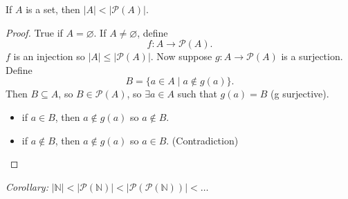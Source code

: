 \documentclass[11pt]{article}
\let\emptyset\varnothing
\begin{document}
   If $A$ is a set, then \(|A| < |\mathcal{P}(A)|.\)

   \begin{proof}
       True if \(A = \emptyset\). If \(A \neq \emptyset\), define \[f:A \rightarrow \mathcal{P}(A).\] $f$ is an injection so \(|A| \leq |\mathcal{P}(A)|.\) Now suppose \(g:A \rightarrow \mathcal{P}(A)\) is a surjection. Define \[B = \{a \in A \mid a \notin g(a)\}.\] Then \(B \subseteq A\), so \(B \in \mathcal{P}(A)\), so \(\exists a \in A\) such that \(g(a) = B\) (g surjective). 
       \begin{itemize}
           \item if \(a \in B\), then \(a \notin g(a)\) so \(a \notin B\).
           \item if \(a \notin B\), then \(a \notin g(a)\) so \(a \in B\). (Contradiction)
       \end{itemize}
   \end{proof}

   \emph{Corollary:} \(|\mathbb{N}| < |\mathcal{P}(\mathbb{N})| < |\mathcal{P}(\mathcal{P}(\mathbb{N}))| < \dots\)
\end{document}
